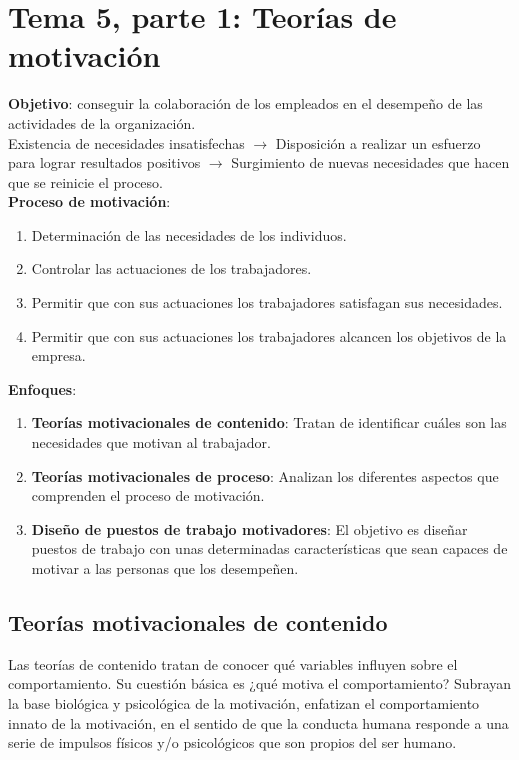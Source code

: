\documentclass[12pt]{article}
\theoremstyle{definition_wo_parentheses}
\begin{document}
\section{Tema 5, parte 1: Teorías de motivación}
\textbf{Objetivo}: conseguir la colaboración de los empleados en el desempeño de las actividades de la organización.
\\
Existencia de necesidades insatisfechas $\rightarrow$ Disposición a realizar un esfuerzo para lograr resultados positivos $\rightarrow$ Surgimiento de nuevas necesidades que hacen que se reinicie el proceso.\\

\textbf{Proceso de motivación}:
\begin{enumerate}
\item Determinación de las necesidades de los individuos.
\item Controlar las actuaciones de los trabajadores.
\item Permitir que con sus actuaciones los trabajadores satisfagan sus necesidades.
\item Permitir que con sus actuaciones los trabajadores alcancen los objetivos de la empresa.
\end{enumerate}


\textbf{Enfoques}:
\begin{enumerate}
\item \textbf{Teorías motivacionales de contenido}: Tratan de identificar cuáles son las necesidades que motivan al trabajador.
\item \textbf{Teorías motivacionales de proceso}: Analizan los diferentes aspectos que comprenden el proceso de motivación.
\item \textbf{Diseño de puestos de trabajo motivadores}: El objetivo es diseñar puestos de trabajo con unas determinadas características que sean capaces de motivar a las personas que los desempeñen.
\end{enumerate}

\subsection{Teorías motivacionales de contenido}
Las teorías de contenido tratan de conocer qué variables influyen sobre el comportamiento. Su cuestión básica es ¿qué motiva el comportamiento? Subrayan la base biológica y psicológica de la motivación, enfatizan el comportamiento innato de la motivación, en el sentido de que la conducta humana responde a una serie de impulsos físicos y/o psicológicos que son propios del ser humano.\\
\end{document}
